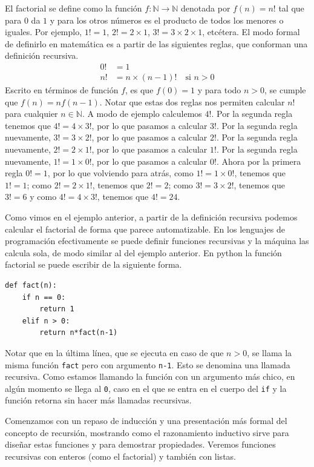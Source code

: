 \documentclass[a4paper, 12pt]{report}
\newcommand{\N}{\mathbb{N}}
\newcommand{\te}{\text}
\theoremstyle{definition}
\begin{document}
El factorial se define como la función $f:\N\to\N$ denotada por $f(n)=n!$ tal que para $0$ da $1$ y para los otros números es el producto de todos los menores o iguales. Por ejemplo, $1!=1$, $2! = 2\times 1$, $3!=3\times 2 \times 1$, etcétera. El modo formal de definirlo en matemática es a partir de las siguientes reglas, que conforman una definición recursiva.
\begin{align*}
	0!&=1\\
	n!&= n\times (n-1)!\quad\te{si }n>0
\end{align*}
Escrito en términos de función $f$, es que $f(0)=1$ y para todo $n>0$, se cumple que $f(n)=nf(n-1)$. Notar que estas dos reglas nos permiten calcular $n!$ para cualquier $n\in\N$. A modo de ejemplo calculemos $4!$. Por la segunda regla tenemos que $4!=4\times 3!$, por lo que pasamos a calcular $3!$. Por la segunda regla nuevamente, $3!=3\times 2!$, por lo que pasamos a calcular $2!$. Por la segunda regla nuevamente, $2!=2\times 1!$, por lo que pasamos a calcular $1!$. Por la segunda regla nuevamente, $1!=1\times 0!$, por lo que pasamos a calcular $0!$. Ahora por la primera regla $0!=1$, por lo que volviendo para atrás, como $1!=1\times 0!$, tenemos que $1! = 1$; como  $2!=2\times 1!$,  tenemos que $2!=2$; como $3!=3\times 2!$, tenemos que $3! = 6$ y como $4!=4\times 3!$, tenemos que $4!=24$.

Como vimos en el ejemplo anterior, a partir de la definición recursiva podemos calcular el factorial de forma que parece automatizable. En los lenguajes de programación efectivamente se puede definir funciones recursivas y la máquina las calcula sola, de modo similar al del ejemplo anterior. En python la función factorial se puede escribir de la siguiente forma.
\begin{verbatim}
def fact(n):
    if n == 0:
        return 1
    elif n > 0:
        return n*fact(n-1)
\end{verbatim}
Notar que en la última línea, que se ejecuta en caso de que $n>0$, se llama la misma función {\tt fact} pero con argumento {\tt n-1}. Esto se denomina una llamada recursiva. Como estamos llamando la función con un argumento más chico, en algún momento se llega al {\tt 0}, caso en el que se entra en el cuerpo del {\tt if} y la función retorna sin hacer más llamadas recursivas.

Comenzamos con un repaso de inducción y una presentación más formal del concepto de recursión, mostrando como el razonamiento inductivo sirve para diseñar estas funciones y para demostrar propiedades. Veremos funciones recursivas con enteros (como el factorial) y también con listas.
\end{document}
